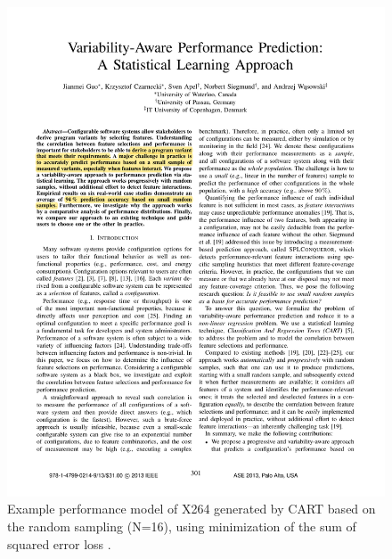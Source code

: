 \begin{figure}
	\centering
	\includegraphics[page=4,clip,trim=3.5cm 18cm 3.5cm 1.5cm, width=11.625cm]
	{Paper/VariabilityAwarePerformancePredictionAStatisticalLearningApproach.pdf}
	\caption{Example performance model of X264 generated by CART based on the random sampling (N=16), using minimization of the sum of squared error loss \cite{VariabilityAwarePerformancePredictionJianmeiSigmundApel}.}	
	\label{fig:VAPPExampleTree}	
\end{figure}
\noindent
\FloatBarrier